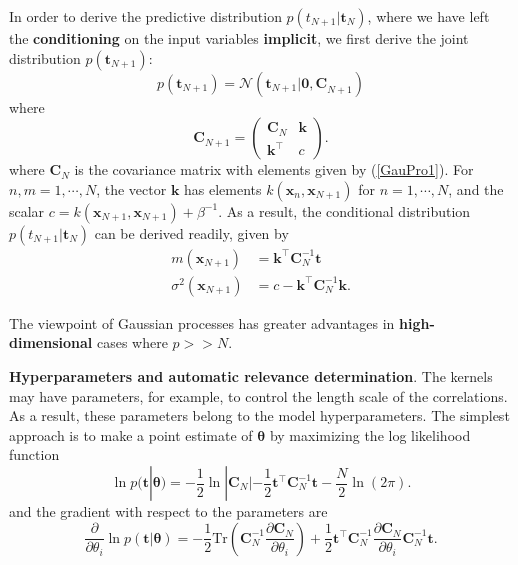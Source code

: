 \documentclass[a4paper]{book}
\newcommand{\up}{\mathrm}
\renewcommand{\bf}{\mathbf}
\renewcommand{\cal}{\mathcal}
\newcommand{\bs}{\boldsymbol}
\begin{document}
In order to derive the predictive distribution $p(t_{N+1}|\bf{t}_N)$, where we have left the \textbf{conditioning} on the input variables \textbf{implicit}, we first derive the joint distribution $p(\bf{t}_{N+1})$:
\begin{equation}
	p(\bf{t}_{N+1}) = \cal{N}(\bf{t}_{N+1}|\bf{0,C}_{N+1})
\end{equation}
where
\begin{equation}
	\bf{C}_{N+1} = \begin{pmatrix}
	 \bf{C}_N & \bf{k} \\
	 \bf{k}^{\intercal} & c
	\end{pmatrix}.
\end{equation}
where $\bf{C}_N$ is the covariance matrix with elements given by (\ref{GauPro1}). For $n,m=1,\cdots,N$, the vector $\bf{k}$ has elements $k(\bf{x}_n,\bf{x}_{N+1})$ for $n=1,\cdots,N$, and the scalar $c=k(\bf{x}_{N+1},\bf{x}_{N+1})+\beta^{-1}$. As a result, the conditional distribution $p(t_{N+1}|\bf{t}_N)$ can be derived readily, given by
\begin{align}
	m(\bf{x}_{N+1}) &= \bf{k}^{\intercal} \bf{C}_N^{-1} \bf{t} \\
	\sigma^2(\bf{x}_{N+1}) &= c - \bf{k}^{\intercal} \bf{C}_N^{-1} \bf{k}.\label{GauPreVar}
\end{align}

The viewpoint of Gaussian processes has greater advantages in \textbf{high-dimensional} cases where $p >> N$.

\textbf{Hyperparameters and automatic relevance determination}. The kernels may have parameters, for example, to control the length scale of the correlations. As a result, these parameters belong to the model hyperparameters. The simplest approach is to make a point estimate of $\bs{\theta}$ by maximizing the log likelihood function
\begin{equation}
 \ln p(\bf{t}|\bs{\theta}) = -\frac{1}{2} \ln |\bf{C}_N| - \frac{1}{2} \bf{t}^{\intercal} \bf{C}_N^{-1} \bf{t} - \frac{N}{2} \ln (2\pi).
\end{equation}
and the gradient with respect to the parameters are
\begin{equation}
	\frac{\partial }{\partial \theta_i} \ln p(\bf{t}|\bs{\theta}) = -\frac{1}{2}\up{Tr}\left( \bf{C}_N^{-1} \frac{\partial \bf{C}_N}{\partial \theta_i} \right) + \frac{1}{2} \bf{t}^{\intercal} \bf{C}_N^{-1} \frac{\partial \bf{C}_N}{\partial \theta_i}\bf{C}_N^{-1} \bf{t}.
\end{equation}
\end{document}

